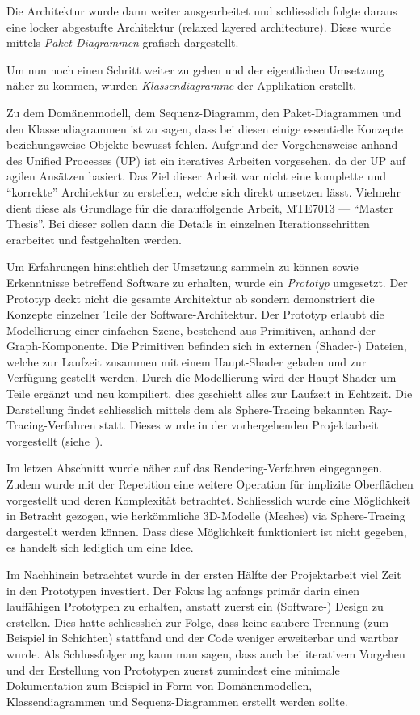 Die Architektur wurde dann weiter ausgearbeitet und schliesslich folgte daraus
eine locker abgestufte Architektur (relaxed layered architecture). Diese wurde
mittels \textit{Paket-Diagrammen} grafisch dargestellt.

Um nun noch einen Schritt weiter zu gehen und der eigentlichen Umsetzung näher
zu kommen, wurden \textit{Klassendiagramme} der Applikation erstellt.

Zu dem Domänenmodell, dem Sequenz-Diagramm, den Paket-Diagrammen und den
Klassendiagrammen ist zu sagen, dass bei diesen einige essentielle
Konzepte beziehungsweise Objekte bewusst fehlen. Aufgrund der Vorgehensweise
anhand des Unified Processes (UP) ist ein iteratives Arbeiten vorgesehen, da
der UP auf agilen Ansätzen basiert. Das Ziel dieser Arbeit war nicht eine
komplette und ``korrekte'' Architektur zu erstellen, welche sich direkt
umsetzen lässt. Vielmehr dient diese als Grundlage für die darauffolgende
Arbeit, MTE7013 --- ``Master Thesis''. Bei dieser sollen dann die Details in
einzelnen Iterationsschritten erarbeitet und festgehalten werden.

Um Erfahrungen hinsichtlich der Umsetzung sammeln zu können sowie Erkenntnisse
betreffend Software zu erhalten, wurde ein \textit{Prototyp} umgesetzt. Der
Prototyp deckt nicht die gesamte Architektur ab sondern demonstriert die
Konzepte einzelner Teile der Software-Architektur. Der Prototyp erlaubt die
Modellierung einer einfachen Szene, bestehend aus Primitiven, anhand der
Graph-Komponente. Die Primitiven befinden sich in externen (Shader-) Dateien,
welche zur Laufzeit zusammen mit einem Haupt-Shader geladen und zur Verfügung
gestellt werden. Durch die Modellierung wird der Haupt-Shader um Teile ergänzt
und neu kompiliert, dies geschieht alles zur Laufzeit in Echtzeit. Die
Darstellung findet schliesslich mittels dem als Sphere-Tracing bekannten
Ray-Tracing-Verfahren statt. Dieses wurde in der vorhergehenden Projektarbeit
vorgestellt (siehe~\cite{osterwalder_sven_volume_2016}).

Im letzen Abschnitt wurde näher auf das Rendering-Verfahren eingegangen. Zudem
wurde mit der Repetition eine weitere Operation für implizite Oberflächen
vorgestellt und deren Komplexität betrachtet. Schliesslich wurde eine
Möglichkeit in Betracht gezogen, wie herkömmliche 3D-Modelle (Meshes) via
Sphere-Tracing dargestellt werden können. Dass diese Möglichkeit funktioniert ist
nicht gegeben, es handelt sich lediglich um eine Idee.

Im Nachhinein betrachtet wurde in der ersten Hälfte der Projektarbeit viel Zeit
in den Prototypen investiert. Der Fokus lag anfangs primär darin einen
lauffähigen Prototypen zu erhalten, anstatt zuerst ein (Software-) Design zu
erstellen. Dies hatte schliesslich zur Folge, dass keine saubere Trennung (zum
Beispiel in Schichten) stattfand und der Code weniger erweiterbar und wartbar
wurde. Als Schlussfolgerung kann man sagen, dass auch bei iterativem Vorgehen
und der Erstellung von Prototypen zuerst zumindest eine minimale Dokumentation
zum Beispiel in Form von Domänenmodellen, Klassendiagrammen und
Sequenz-Diagrammen erstellt werden sollte.
